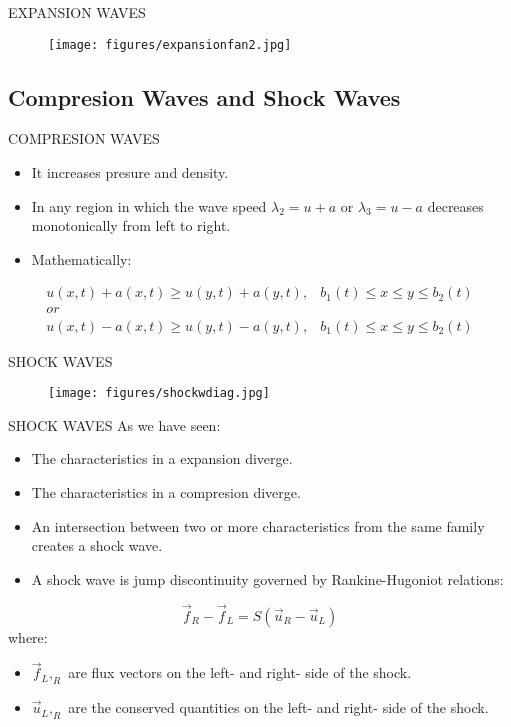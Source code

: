 \documentclass{beamer}
\begin{document}
\begin{frame}{EXPANSION WAVES}
  \begin{figure}
   \texttt{[image: figures/expansionfan2.jpg]}
  \end{figure}
\end{frame}

\subsection{Compresion Waves and Shock Waves}

\begin{frame}{COMPRESION WAVES}
  \begin{itemize}
   \item It increases presure and density.
   \item In any region in which the wave speed $\lambda_2=u+a$ or $\lambda_3=u-a$ decreases monotonically from left to right. 
   \item Mathematically:
  \end{itemize}
  \begin{equation}
  \begin{matrix}
   u(x,t)+a(x,t)\geq{u(y,t)+a(y,t)}, & b_1(t)\leq{x}\leq{y}\leq{b_2(t)}\\
   or \\
   u(x,t)-a(x,t)\geq{u(y,t)-a(y,t)}, & b_1(t)\leq{x}\leq{y}\leq{b_2(t)}
  \end{matrix}
  \end{equation}
\end{frame}

\begin{frame}{SHOCK WAVES}
  \begin{figure}
   \texttt{[image: figures/shockwdiag.jpg]}
  \end{figure}
\end{frame}

\begin{frame}{SHOCK WAVES}
As we have seen:  
  \begin{itemize}
   \item The characteristics in a expansion diverge.
    \item The characteristics in a compresion diverge.
    \item An intersection between two or more characteristics from the same family creates a shock wave.
    \item A shock wave is jump discontinuity governed by Rankine-Hugoniot relations:
  \end{itemize}
    \begin{equation}
     \vec{f}_R-\vec{f}_L=S(\vec{u}_R-\vec{u}_L)
    \end{equation}
where:
  \begin{itemize}
   \item $\vec{f}_L,_R$ are flux vectors on the left- and right- side of the shock.
    \item $\vec{u}_L,_R$ are the conserved quantities on the left- and right- side of the shock.
  \end{itemize}
\end{frame}
\end{document}

